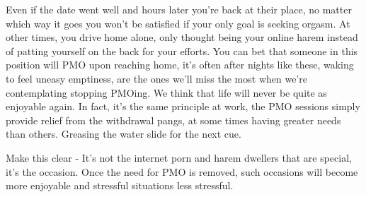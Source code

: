 \documentclass[easypeasy.tex]{subfiles}
\begin{document}
Even if the date went well and hours later you're back at their place, no matter which way it goes you won't be satisfied if your only goal is seeking orgasm. At other times, you drive home alone, only thought being your online harem instead of patting yourself on the back for your efforts. You can bet that someone in this position will PMO upon reaching home, it's often after nights like these, waking to feel uneasy emptiness, are the ones we'll miss the most when we're contemplating stopping PMOing. We think that life will never be quite as enjoyable again. In fact, it's the same principle at work, the PMO sessions simply provide relief from the withdrawal pangs, at some times having greater needs than others. Greasing the water slide for the next cue.

Make this clear - It's not the internet porn and harem dwellers that are special, it's the occasion. Once the need for PMO is removed, such occasions will become more enjoyable and stressful situations less stressful.
\end{document}

